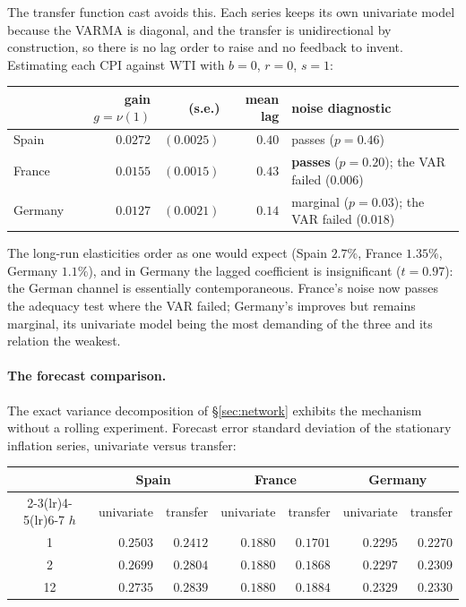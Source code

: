 \documentclass[11pt,a4paper]{article}
\theoremstyle{plain}
\theoremstyle{remark}
\begin{document}
The transfer function cast avoids this. Each series keeps its own univariate model
because the VARMA is diagonal, and the transfer is unidirectional by construction,
so there is no lag order to raise and no feedback to invent. Estimating each CPI
against WTI with $b=0$, $r=0$, $s=1$:

\begin{center}
\begin{tabular}{lrrrl}
\toprule
 & gain $g=\nu(1)$ & (s.e.) & mean lag & noise diagnostic \\
\midrule
Spain   & $0.0272$ & $(0.0025)$ & $0.40$ & passes ($p=0.46$) \\
France  & $0.0155$ & $(0.0015)$ & $0.43$ & \textbf{passes} ($p=0.20$); the VAR failed ($0.006$) \\
Germany & $0.0127$ & $(0.0021)$ & $0.14$ & marginal ($p=0.03$); the VAR failed ($0.018$) \\
\bottomrule
\end{tabular}
\end{center}

The long-run elasticities order as one would expect (Spain $2.7\%$, France
$1.35\%$, Germany $1.1\%$), and in Germany the lagged coefficient is insignificant
($t=0.97$): the German channel is essentially contemporaneous. France's noise now
passes the adequacy test where the VAR failed; Germany's improves but remains
marginal, its univariate model being the most demanding of the three and its
relation the weakest.

\paragraph{The forecast comparison.} The exact variance decomposition of
\S\ref{sec:network} exhibits the mechanism without a rolling experiment. Forecast
error standard deviation of the stationary inflation series, univariate versus
transfer:

\begin{center}
\begin{tabular}{crrrrrr}
\toprule
 & \multicolumn{2}{c}{Spain} & \multicolumn{2}{c}{France} & \multicolumn{2}{c}{Germany}\\
\cmidrule(lr){2-3}\cmidrule(lr){4-5}\cmidrule(lr){6-7}
$h$ & univariate & transfer & univariate & transfer & univariate & transfer\\
\midrule
 1 & $0.2503$ & $\mathbf{0.2412}$ & $0.1880$ & $\mathbf{0.1701}$ & $0.2295$ & $\mathbf{0.2270}$\\
 2 & $0.2699$ & $0.2804$ & $0.1880$ & $0.1868$ & $0.2297$ & $0.2309$\\
12 & $0.2735$ & $0.2839$ & $0.1880$ & $0.1884$ & $0.2329$ & $0.2330$\\
\bottomrule
\end{tabular}
\end{center}
\end{document}
